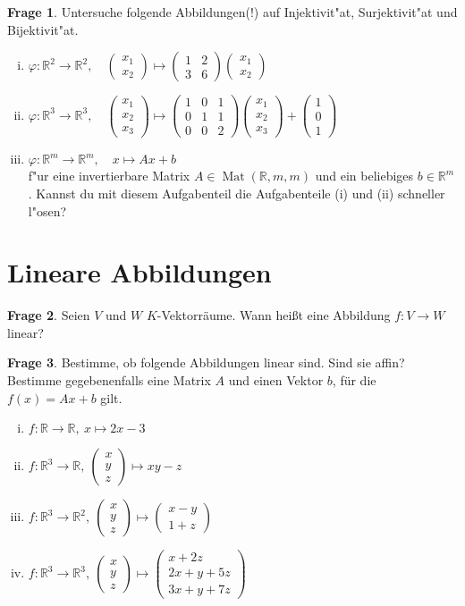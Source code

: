 \documentclass{scrartcl}
\theoremstyle{definition}
\newtheorem{frage}{Frage}[section]
\newcommand{\R}{\mathbb R}
\newcommand{\mat}[1]{\begin{pmatrix} #1 \end{pmatrix}}
\let\tmpphi\phi
\let\phi\varphi
\let\varphi\tmpphi
\DeclareMathOperator{\Mat}{Mat}
\begin{document}
\begin{frage}
Untersuche folgende Abbildungen(!) auf Injektivit"at, Surjektivit"at und Bijektivit"at.
\begin{enumerate}[(i)]
\item $\phi\colon \R^2 \to \R^2, \quad \mat{x_1 \\ x_2} \mapsto \mat{1 & 2\\3 & 6} \mat{x_1 \\ x_2}$
\item $\phi\colon \R^3 \to \R^3, \quad \mat{x_1 \\ x_2 \\ x_3} \mapsto \mat{1 & 0 & 1\\0 & 1 & 1\\0 & 0 & 2} \mat{x_1 \\ x_2 \\ x_3} + \mat{1 \\ 0 \\ 1}$
\item $\phi\colon \R^m \to \R^m, \quad x \mapsto A x + b$\\ f"ur eine invertierbare Matrix $A \in \Mat(\R, m,m)$ und ein beliebiges $b \in \R^m$.
Kannst du mit diesem Aufgabenteil die Aufgabenteile (i) und (ii) schneller l"osen?
\end{enumerate}
\end{frage}

\section{Lineare Abbildungen}

\begin{frage}Seien $V$ und $W$ $K$-Vektorräume. 
Wann heißt eine Abbildung $f\colon V \to W$ linear?
\end{frage}

\clearpage

\begin{frage}
Bestimme, ob folgende Abbildungen linear sind. Sind sie affin? Bestimme gegebenenfalls eine Matrix $A$ und einen Vektor $b$, für die $f(x) = Ax + b$ gilt.
\begin{multicols}{2}
\begin{enumerate}[(i)]
\item $f\colon \R \to \R, \: x \mapsto 2x - 3$
\item $f\colon \R^3 \to \R, \: \mat{x \\ y \\ z} \mapsto xy - z$
\item $f\colon \R^3 \to \R^2, \: \mat{x \\ y \\ z} \mapsto \mat{ x -y \\ 1 + z} $
\item $f\colon \R^3 \to \R^3, \: \mat{x \\ y \\ z} \mapsto \mat{x + 2z \\ 2x + y + 5z \\ 3x + y  + 7z}$
\end{enumerate}
\end{multicols}
\end{frage}
\end{document}

